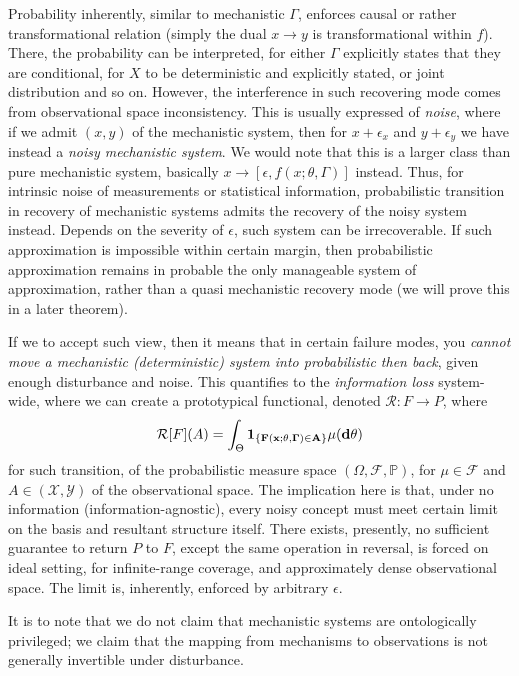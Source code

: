 Probability inherently, similar to mechanistic $\Gamma$, enforces causal or rather transformational relation (simply the dual $x\to y$ is transformational within $f$). There, the probability can be interpreted, for either $\Gamma$ explicitly states that they are conditional, for $X$ to be deterministic and explicitly stated, or joint distribution and so on. However, the interference in such recovering mode comes from observational space inconsistency. This is usually expressed of \textit{noise}, where if we admit $(x,y)$ of the mechanistic system, then for $x+\epsilon_{x}$ and $y+\epsilon_{y}$ we have instead a \textit{noisy mechanistic system}. We would note that this is a larger class than pure mechanistic system, basically $x\to [\epsilon, f(x;\theta,\Gamma)]$ instead. Thus, for intrinsic noise of measurements or statistical information, probabilistic transition in recovery of mechanistic systems admits the recovery of the noisy system instead. Depends on the severity of $\epsilon$, such system can be irrecoverable. If such approximation is impossible within certain margin, then probabilistic approximation remains in probable the only manageable system of approximation, rather than a quasi mechanistic recovery mode (we will prove this in a later theorem). 

If we to accept such view, then it means that in certain failure modes, you \textit{cannot move a mechanistic (deterministic) system into probabilistic then back}, given enough disturbance and noise. This quantifies to the \textit{information loss} system-wide, where we can create a prototypical functional, denoted $\mathcal{R}:F\to P$, where
\begin{equation}
    \mathcal{R}[F](A) = \int_{\Theta} \bf{1}_{\{F(x;\theta,\Gamma)\in A\}}\mu (d\theta)
\end{equation}
for such transition, of the probabilistic measure space $(\Omega, \mathcal{F},\mathbb{P})$, for $\mu\in \mathcal{F}$ and $A\in(\mathcal{X},\mathcal{Y})$ of the observational space. The implication here is that, under no information (information-agnostic), every noisy concept must meet certain limit on the basis and resultant structure itself. There exists, presently, no sufficient guarantee to return $P$ to $F$, except the same operation in reversal, is forced on ideal setting, for infinite-range coverage, and approximately dense observational space. The limit is, inherently, enforced by arbitrary $\epsilon$. 

It is to note that we do not claim that mechanistic systems are ontologically privileged; we claim that the mapping from mechanisms to observations is not generally invertible under disturbance.

